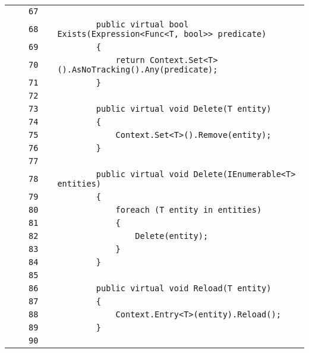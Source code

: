\documentclass[a4paper,10pt]{article}
\begin{document}
\begin{longtable}[l]{lrrll}
\cellcolor{gray} &  & \verb~67~ & & \verb~~\\
\cellcolor{gray} &  & \verb~68~ & & \verb~        public virtual bool Exists(Expression<Func<T, bool>> predicate)~\\
\cellcolor{gray} &  & \verb~69~ & & \verb~        {~\\
\cellcolor{gray} &  & \verb~70~ & & \verb~            return Context.Set<T>().AsNoTracking().Any(predicate);~\\
\cellcolor{gray} &  & \verb~71~ & & \verb~        }~\\
\cellcolor{gray} &  & \verb~72~ & & \verb~~\\
\cellcolor{gray} &  & \verb~73~ & & \verb~        public virtual void Delete(T entity)~\\
\cellcolor{gray} &  & \verb~74~ & & \verb~        {~\\
\cellcolor{gray} &  & \verb~75~ & & \verb~            Context.Set<T>().Remove(entity);~\\
\cellcolor{gray} &  & \verb~76~ & & \verb~        }~\\
\cellcolor{gray} &  & \verb~77~ & & \verb~~\\
\cellcolor{gray} &  & \verb~78~ & & \verb~        public virtual void Delete(IEnumerable<T> entities)~\\
\cellcolor{gray} &  & \verb~79~ & & \verb~        {~\\
\cellcolor{gray} &  & \verb~80~ & & \verb~            foreach (T entity in entities)~\\
\cellcolor{gray} &  & \verb~81~ & & \verb~            {~\\
\cellcolor{gray} &  & \verb~82~ & & \verb~                Delete(entity);~\\
\cellcolor{gray} &  & \verb~83~ & & \verb~            }~\\
\cellcolor{gray} &  & \verb~84~ & & \verb~        }~\\
\cellcolor{gray} &  & \verb~85~ & & \verb~~\\
\cellcolor{gray} &  & \verb~86~ & & \verb~        public virtual void Reload(T entity)~\\
\cellcolor{gray} &  & \verb~87~ & & \verb~        {~\\
\cellcolor{gray} &  & \verb~88~ & & \verb~            Context.Entry<T>(entity).Reload();~\\
\cellcolor{gray} &  & \verb~89~ & & \verb~        }~\\
\cellcolor{gray} &  & \verb~90~ & & \verb~~\\

\end{longtable}
\end{document}
